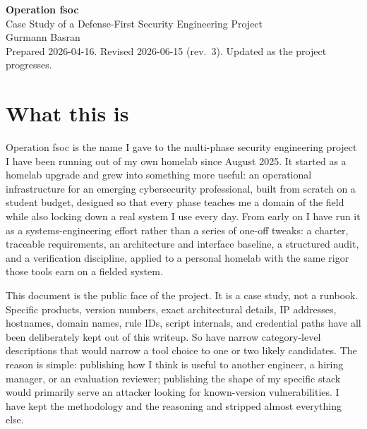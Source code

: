 \documentclass[12pt]{article}
\begin{document}
\begin{center}
{\LARGE\textbf{Operation fsoc}}\\[4pt]
{\large Case Study of a Defense-First Security Engineering Project}\\[6pt]
Gurmann Basran\\
\small Prepared 2026-04-16. Revised 2026-06-15 (rev.\ 3). Updated as the project progresses.
\end{center}

\section{What this is}

Operation fsoc is the name I gave to the multi-phase security engineering project I have been running out of my own homelab since August 2025. It started as a homelab upgrade and grew into something more useful: an operational infrastructure for an emerging cybersecurity professional, built from scratch on a student budget, designed so that every phase teaches me a domain of the field while also locking down a real system I use every day. From early on I have run it as a systems-engineering effort rather than a series of one-off tweaks: a charter, traceable requirements, an architecture and interface baseline, a structured audit, and a verification discipline, applied to a personal homelab with the same rigor those tools earn on a fielded system.

This document is the public face of the project. It is a case study, not a runbook. Specific products, version numbers, exact architectural details, IP addresses, hostnames, domain names, rule IDs, script internals, and credential paths have all been deliberately kept out of this writeup. So have narrow category-level descriptions that would narrow a tool choice to one or two likely candidates. The reason is simple: publishing how I think is useful to another engineer, a hiring manager, or an evaluation reviewer; publishing the shape of my specific stack would primarily serve an attacker looking for known-version vulnerabilities. I have kept the methodology and the reasoning and stripped almost everything else.
\end{document}
